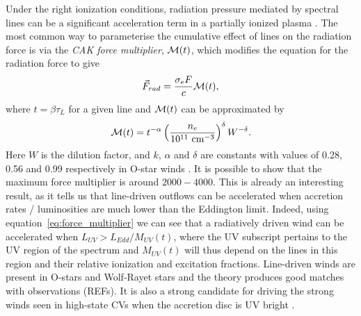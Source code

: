 \label{sec:line_driving}

Under the right ionization conditions, radiation pressure mediated by spectral lines
can be a significant  acceleration term in 
a partially ionized plasma \citep[][hereafter CAK]{CAK75}. 
The most common way to parameterise the cumulative
effect of lines on the radiation force is via the {\em CAK force multiplier}, ${\cal M}(t)$,
which modifies the equation for the radiation force to give \citep[][CAK, ]{castor1974}
\begin{equation}
\label{eq:force_multiplier}
\vec{F}_{rad} = \frac{\sigma_e F}{c} {\cal M}(t),
\end{equation}
where $t = \beta \tau_L$ for a given line and ${\cal M}(t)$ can be approximated by
\begin{equation}
\label{eq:force_multiplier2}
{\cal M}(t) = t^{-\alpha} 
\left( \frac{n_e}{10^{11}~{\rm cm}^{-3}}\right)^\delta W^{-\delta}.
\end{equation}
Here $W$ is the dilution factor, and $k$, $\alpha$ and $\delta$ are constants with
values of 0.28, 0.56 and 0.99 respectively in O-star winds \citep{abbott1982}.
It is possible to show \citep[CAK, ][]{owocki1988} that the maximum force multiplier
is around $2000-4000$. This is already an interesting result, as it tells us
that line-driven outflows can be accelerated when accretion rates / luminosities
are much lower than the Eddington limit. Indeed, using 
equation~\ref{eq:force_multiplier} we can see that a radiatively driven wind 
can be accelerated when $L_{UV} > L_{Edd} / M_{UV}(t)$, where the UV subscript 
pertains to the UV region of the spectrum and $M_{UV}(t)$ will thus depend on
the lines in this region and their relative ionization and excitation fractions.
Line-driven winds are present in O-stars and Wolf-Rayet stars and the theory
produces good matches with observations (REFs). It is also a strong candidate for driving
the strong winds seen in high-state CVs when the accretion disc is UV bright 
\citep[e.g.][see also section~\ref{sec:proga}]{pereyra1997,proga1998,proga2005}.

